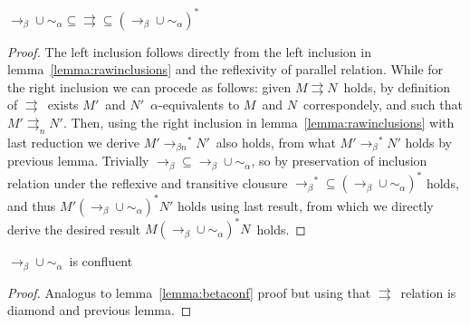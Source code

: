 \documentclass{article}
\newcommand{\alp}{\ensuremath{\alpha}}
\newcommand{\alpsym}{\ensuremath{\sim_\alpha}}
\newcommand{\p}{\ensuremath{\rightrightarrows}}
\newcommand{\pn}{\ensuremath{\rightrightarrows_n}}
\newcommand{\betar}{\ensuremath{\rightarrow_{\beta}}}
\newcommand{\betarn}{\ensuremath{\rightarrow_{\beta n}}}
\begin{document}
 \begin{lemma}{$\betar \cup \alpsym \subseteq \p \subseteq (\betar \cup \alpsym)^*$}
 \end{lemma}

\begin{proof}
 The left inclusion follows directly from the left inclusion in lemma~\ref{lemma:rawinclusions} and the reflexivity of parallel relation. While for the right inclusion we can procede as follows: given $M \p N$\ holds, by definition of \p\, exists $M'$\ and $N'$\ \alp-equivalents to $M$\ and $N$\ correspondely, and such that $M' \pn N'$. Then, using the right inclusion in lemma~\ref{lemma:rawinclusions} with last reduction we derive $M' \betarn^* N'$\ also holds, from what $M' \betar^* N'$ holds by previous lemma. Trivially $\betar \subseteq \betar \cup \alpsym$, so by preservation of inclusion relation under the reflexive and transitive clousure $\betar^* \subseteq (\betar \cup \alpsym)^*$ holds, and thus $M' (\betar \cup \alpsym)^* N'$ holds using last result, from which we directly derive the desired result $M (\betar \cup \alpsym)^* N$\ holds.
\end{proof}


\begin{theorem}{$\betar \cup \alpsym$\ is confluent}
  
\end{theorem}

\begin{proof}
   Analogus to lemma~\ref{lemma:betaconf} proof but using that \p\ relation is diamond and previous lemma.   
\end{proof}




\end{document}
